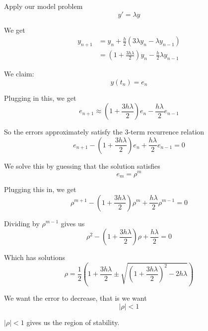 \documentclass[12pt,letterpaper]{article}
\begin{document}
Apply our model problem
\begin{equation}
	y' = \lambda y
\end{equation}

We get
\begin{align}
	y_{n+1} &= y_n + \frac{h}{2}(3 \lambda y_n - \lambda y_{n-1}) \\
	&= \left( 1 + \frac{3h\lambda}{2} \right) y_n - \frac{h}{2} \lambda y_{n-1}
\end{align}

We claim:
\begin{equation}
	y(t_n) = e_n
\end{equation}

Plugging in this, we get
\begin{equation}
	e_{n+1} \approx \left( 1 + \frac{3h\lambda}{2} \right) e_n - \frac{h\lambda}{2}e_{n-1}
\end{equation}

So the errors approximately satisfy the 3-term recurrence relation
\begin{equation}
	e_{n+1} - \left( 1 + \frac{3h\lambda}{2} \right) e_n + \frac{h\lambda}{2}e_{n-1} = 0
\end{equation}

We solve this by guessing that the solution satisfies
\begin{equation}
	e_m = \rho^m
\end{equation}

Plugging this in, we get
\begin{equation}
	\rho^{m+1} - \left( 1 + \frac{3h\lambda}{2} \right) \rho^m + \frac{h\lambda}{2}\rho^{m-1} = 0
\end{equation}

Dividing by $\rho^{m-1}$ gives us
\begin{equation}
	\rho^2 - \left( 1 + \frac{3h\lambda}{2} \right) \rho + \frac{h\lambda}{2} = 0
\end{equation}

Which has solutions
\begin{equation}
	\rho = \frac{1}{2} \left( 1 + \frac{3h\lambda}{2} \pm \sqrt{\left( 1 + \frac{3h\lambda}{2} \right)^2 - 2h\lambda} \right)
\end{equation}

We want the error to decrease, that is we want
\begin{equation}
	\lvert \rho \rvert < 1
\end{equation}

$\lvert \rho \rvert < 1$ gives us the region of stability.
\end{document}
